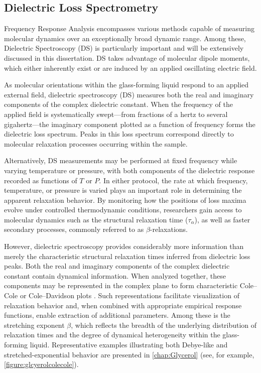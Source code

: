 \subsection{Dielectric Loss Spectrometry} \label{sec:FRAintro}

Frequency Response Analysis encompasses various methods capable of measuring molecular dynamics over an exceptionally broad dynamic range. Among these, Dielectric Spectroscopy (DS) is particularly important and will be extensively discussed in this dissertation. DS takes advantage of molecular dipole moments, which either inherently exist or are induced by an applied oscillating electric field.

As molecular orientations within the glass-forming liquid respond to an applied external field, dielectric spectroscopy (DS) measures both the real and imaginary components of the complex dielectric constant. When the frequency of the applied field is systematically swept—from fractions of a hertz to several gigahertz—the imaginary component plotted as a function of frequency forms the dielectric loss spectrum. Peaks in this loss spectrum correspond directly to molecular relaxation processes occurring within the sample. 

Alternatively, DS measurements may be performed at fixed frequency while varying temperature or pressure, with both components of the dielectric response recorded as functions of $T$ or $P$. In either protocol, the rate at which frequency, temperature, or pressure is varied plays an important role in determining the apparent relaxation behavior. By monitoring how the positions of loss maxima evolve under controlled thermodynamic conditions, researchers gain access to molecular dynamics such as the structural relaxation time ($\tau_{\alpha}$), as well as faster secondary processes, commonly referred to as $\beta$-relaxations.

However, dielectric spectroscopy provides considerably more information than merely the characteristic structural relaxation times inferred from dielectric loss peaks. Both the real and imaginary components of the complex dielectric constant contain dynamical information. When analyzed together, these components may be represented in the complex plane to form characteristic Cole--Cole or Cole--Davidson plots \cite{Davidson}. Such representations facilitate visualization of relaxation behavior and, when combined with appropriate empirical response functions, enable extraction of additional parameters. Among these is the stretching exponent $\beta$, which reflects the breadth of the underlying distribution of relaxation times and the degree of dynamical heterogeneity within the glass-forming liquid. Representative examples illustrating both Debye-like and stretched-exponential behavior are presented in \chap \nolinebreak \ref{chap:Glycerol} (see, for example, \fig \nolinebreak \ref{figure:glcyerolcolecole}).


